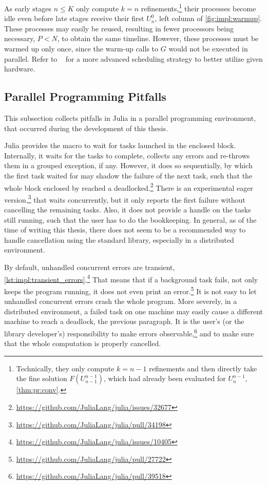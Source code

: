 As early stages $n \leq K$ only compute $k=n$ refinements,\footnote{%
  Technically, they only compute $k=n-1$ refinements and then directly take the fine solution $F(U_{n-1}^{n-1})$,
  which had already been evaluated for $U_n^{n-1}$,
  \cf \autoref{thm:pr:conv}.
}
their processes become idle even before late stages receive their first $U^0_n$,
\cf \eg left column of \autoref{fig:impl:warmup}.
These processes may easily be reused,
resulting in fewer processors being necessary, $P < N$,
to obtain the same timeline.
However, these processes must be warmed up only once,
since the warm-up calls to $G$ would not be executed in parallel.
Refer to \eg \citeauthor*{Nielsen2018}~\cite{Nielsen2018} for a more advanced scheduling strategy to better utilize given hardware.

\subsection{Parallel Programming Pitfalls}

This subsection collects pitfalls in Julia in a parallel programming environment,
that occurred during the development of this thesis.

Julia provides the  macro to wait for tasks launched in the enclosed block.
Internally, it waits for the tasks to complete,
collects any errors and re-throws them in a grouped exception, if any.
However, it does so sequentially,
by which the first task waited for may shadow the failure of the next task,
such that the whole block enclosed by  reached a deadlocked.\footnote{%
  \url{https://github.com/JuliaLang/julia/issues/32677}}
There is an experimental eager version,\footnote{%
  \url{https://github.com/JuliaLang/julia/pull/34198}}
that waits concurrently,
but it only reports the first failure without cancelling the remaining tasks.
Also, it does not provide a handle on the tasks still running,
such that the user has to do the bookkeeping.
In general, as of the time of writing this thesis,
there does not seem to be a recommended way to handle cancellation using the standard library,
especially in a distributed environment.

By default, unhandled concurrent errors are transient,
\cf \autoref{lst:impl:transient_errors}.\footnote{%
  \url{https://github.com/JuliaLang/julia/issues/10405}}
That means that if a background task fails,
not only keeps the program running,
it does not even print an error.\footnote{%
  \url{https://github.com/JuliaLang/julia/pull/27722}}
It is not easy to let unhandled concurrent errors crash the whole program.
More severely, in a distributed environment,
a failed task on one machine may easily cause a different machine to reach a deadlock,
\cf the previous paragraph.
It is the user's (or the library developer's) responsibility to make errors observable,\footnote{%
  \url{https://github.com/JuliaLang/julia/pull/39518}}
and to make sure that the whole computation is properly cancelled.

